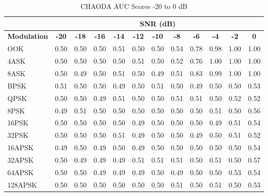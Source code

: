 \documentclass[conference]{IEEEtran}
\begin{document}
\onecolumn
\begin{table}
\centering
\caption{CHAODA AUC Scores -20 to 0 dB}
\begin{tabular}{|l|l|l|l|l|l|l|l|l|l|l|l|} 
\hline
     & \multicolumn{11}{c|}{\textbf{SNR (dB)}}                                                                                                                                                                                                                                                                                                                                 \\
\hline
\multicolumn{1}{|c|}{\textbf{Modulation}} & \multicolumn{1}{c|}{\textbf{-20}} & \multicolumn{1}{c|}{\textbf{-18}} & \multicolumn{1}{c|}{\textbf{-16}} & \multicolumn{1}{c|}{\textbf{-14}} & \multicolumn{1}{c|}{\textbf{-12}} & \multicolumn{1}{c|}{\textbf{-10}} & \multicolumn{1}{c|}{\textbf{-8}} & \multicolumn{1}{c|}{\textbf{-6}} & \multicolumn{1}{c|}{\textbf{-4}} & \multicolumn{1}{c|}{\textbf{-2}} & \multicolumn{1}{c|}{\textbf{0}}  \\ 
\hline OOK & 0.50  & 0.50 & 0.50  & 0.51  & 0.50  & 0.50  & 0.54  & 0.78 & 0.98  & 1.00 & 1.00\\ 
\hline 4ASK & 0.50   & 0.50  & 0.50  & 0.50   & 0.51  & 0.50  & 0.52 & 0.76 & 1.00 & 1.00 & 1.00\\ 
\hline 8ASK & 0.50 & 0.49 & 0.50 & 0.51 & 0.50 & 0.49 & 0.51 & 0.83 & 0.99 & 1.00 & 1.00\\ 
\hline BPSK & 0.51 & 0.50 & 0.50 & 0.49 & 0.50 & 0.51 & 0.50 & 0.49 & 0.50 & 0.50 & 0.53\\ 
\hline QPSK & 0.50 & 0.50 & 0.49 & 0.51 & 0.50 & 0.50 & 0.51  & 0.51  & 0.50  & 0.52 & 0.52\\ 
\hline 8PSK & 0.49 & 0.51 & 0.50 & 0.50 & 0.50 & 0.50 & 0.50 & 0.50 & 0.51 & 0.50 & 0.56\\ 
\hline 16PSK & 0.50 & 0.50 & 0.50 & 0.50 & 0.49 & 0.50 & 0.50 & 0.50 & 0.49 & 0.51 & 0.54\\ 
\hline 32PSK & 0.50 & 0.50 & 0.50 & 0.51 & 0.49 & 0.50 & 0.50 & 0.49 & 0.50 & 0.51 & 0.52\\ 
\hline 16APSK & 0.49 & 0.50 & 0.49 & 0.50 & 0.49 & 0.50 & 0.50 & 0.50 & 0.50 & 0.50 & 0.54\\ 
\hline 32APSK & 0.50 & 0.49 & 0.49 & 0.49 & 0.51 & 0.51 & 0.51 & 0.50 & 0.51 & 0.50 & 0.57\\ 
\hline 64APSK & 0.50 & 0.50 & 0.49 & 0.49 & 0.49 & 0.50 & 0.49 & 0.50 & 0.50 & 0.53 & 0.54\\ 
\hline 128APSK & 0.50 & 0.50 & 0.50 & 0.50 & 0.50 & 0.50 & 0.51 & 0.50 & 0.51 & 0.50 & 0.53\\ 

\end{tabular}
\end{table}
\end{document}

